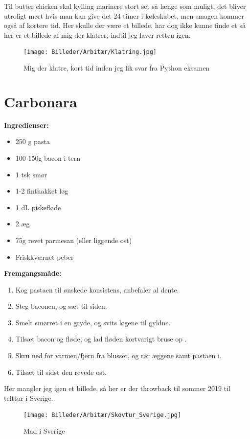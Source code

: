 \documentclass{book}
\begin{document}
Til butter chicken skal kylling marinere stort set så længe som muligt, det bliver utroligt mørt hvis man kan give det 24 timer i køleskabet, men smagen kommer også af kortere tid.
\newpage Her skulle der være et billede, har dog ikke kunne finde et så her er et billede af mig der klatrer, indtil jeg laver retten igen.
\begin{figure}
    \centering
    \texttt{[image: Billeder/Arbitær/Klatring.jpg]}
    \caption{Mig der klatre, kort tid inden jeg fik svar fra Python eksamen}
    \label{fig:Klatring}
\end{figure}
\newpage \section{Carbonara}
\begin{minipage}[t]{0.5\textwidth}
\textbf{Ingredienser:}
\begin{itemize}
    \item 250 g pasta
    \item 100-150g bacon i tern
    \item 1 tsk smør
    \item 1-2 finthakket løg
    \item 1 dL piskefløde
    \item 2 æg
    \item 75g revet parmesan (eller liggende ost)
    \item Friskkværnet peber
\end{itemize}
\end{minipage}
\begin{minipage}[t]{0.5\textwidth}
\textbf{Fremgangsmåde:}
\begin{enumerate}
    \item Kog pastaen til ønskede konsistens, anbefaler al dente.
    \item Steg baconen, og sæt til siden.
    \item Smelt smørret i en gryde, og svits løgene til gyldne.
    \item Tilsæt bacon og fløde, og lad fløden kortvarigt bruse op .
    \item Skru ned for varmen/fjern fra blusset, og rør æggene samt pastaen i. 
    \item Tilsæt til sidst den revede ost.
\end{enumerate}
\end{minipage}
\newpage
Her mangler jeg igen et billede, så her er der throwback til sommer 2019 til telttur i Sverige.
\begin{figure}
    \centering
    \texttt{[image: Billeder/Arbitær/Skovtur\_Sverige.jpg]}
    \caption{Mad i Sverige}
    \label{fig:Arbitær 2}
\end{figure}
\end{document}
